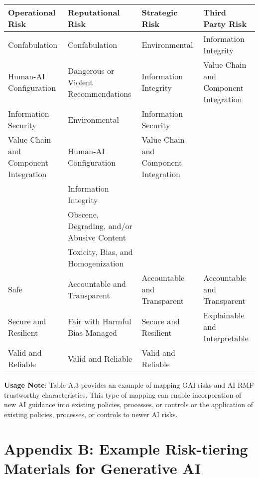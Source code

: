 \documentclass[fleqn]{article}
\begin{document}
\begin{landscape}
\begin{table}[H]
\begin{tabular}{llll}
		\bottomrule
	\end{tabular}
	\newline
	\vspace{10pt}
	\newline	
	\begin{tabular}{llll}
		\toprule
		\textbf{Operational Risk} & \textbf{Reputational Risk} & \textbf{Strategic Risk} & \textbf{Third Party Risk} \\
		\midrule
	 	Confabulation & Confabulation & Environmental & Information Integrity \\
	 	Human-AI Configuration & Dangerous or Violent Recommendations & Information Integrity & Value Chain and Component Integration \\
	 	Information Security & Environmental & Information Security & \\
	 	Value Chain and Component Integration & Human-AI Configuration & Value Chain and Component Integration & \\
	 	& Information Integrity & & \\
	 	& Obscene, Degrading, and/or Abusive Content & & \\
	 	& Toxicity, Bias, and Homogenization & & \\
	 	\midrule 
	 	Safe & Accountable and Transparent & Accountable and Transparent & Accountable and Transparent \\
	 	Secure and Resilient & Fair with Harmful Bias Managed & Secure and Resilient & Explainable and Interpretable \\
	 	Valid and Reliable & Valid and Reliable & Valid and Reliable & \\
		\bottomrule
	\end{tabular}
\end{table}

\noindent\textbf{Usage Note}: Table A.3 provides an example of mapping GAI risks and AI RMF trustworthy characteristics. This type of mapping can enable incorporation of new AI guidance into existing policies, processes, or controls or the application of existing policies, processes, or controls to newer AI risks.

\vfill
\raisebox{-10pt}{\makebox[\linewidth]{\thepage}}
\end{landscape}

\section*{Appendix B: Example Risk-tiering Materials for Generative AI}\label{sec:appndxb}
\end{document}
